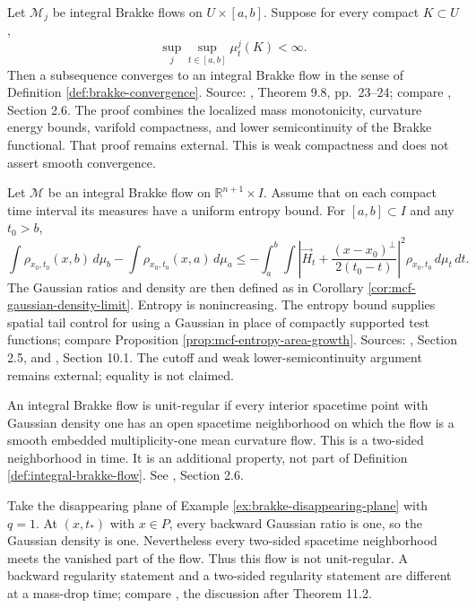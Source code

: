 \begin{theorem}\label{thm:brakke-compactness}
Let $\mathcal M_j$ be integral Brakke flows on $U\times[a,b]$. Suppose for every compact $K\subset U$,
\[
 \sup_j\sup_{t\in[a,b]}\mu_t^j(K)<\infty.
\]
Then a subsequence converges to an integral Brakke flow in the sense of Definition \ref{def:brakke-convergence}. Source: \cite{WhiMCF15}, Theorem 9.8, pp.~23--24; compare \cite{CCMS20}, Section 2.6. The proof combines the localized mass monotonicity, curvature energy bounds, varifold compactness, and lower semicontinuity of the Brakke functional. That proof remains external. This is weak compactness and does not assert smooth convergence.
\end{theorem}

\begin{theorem}\label{thm:brakke-gaussian-monotonicity}
Let $\mathcal M$ be an integral Brakke flow on $\mathbb R^{n+1}\times I$. Assume that on each compact time interval its measures have a uniform entropy bound. For $[a,b]\subset I$ and any $t_0>b$,
\[
 \int\rho_{x_0,t_0}(x,b)\,d\mu_b-
 \int\rho_{x_0,t_0}(x,a)\,d\mu_a
 \leq-\int_a^b\int\left|\vec H_t+
 \frac{(x-x_0)^\perp}{2(t_0-t)}\right|^2\rho_{x_0,t_0}\,d\mu_t\,dt.
\]
The Gaussian ratios and density are then defined as in Corollary \ref{cor:mcf-gaussian-density-limit}. Entropy is nonincreasing. The entropy bound supplies spatial tail control for using a Gaussian in place of compactly supported test functions; compare Proposition \ref{prop:mcf-entropy-area-growth}. Sources: \cite{CCMS20}, Section 2.5, and \cite{WhiMCF15}, Section 10.1. The cutoff and weak lower-semicontinuity argument remains external; equality is not claimed.
\end{theorem}

\begin{definition}\label{def:unit-regular-brakke}
An integral Brakke flow is unit-regular if every interior spacetime point with Gaussian density one has an open spacetime neighborhood on which the flow is a smooth embedded multiplicity-one mean curvature flow. This is a two-sided neighborhood in time. It is an additional property, not part of Definition \ref{def:integral-brakke-flow}. See \cite{CCMS20}, Section 2.6.
\end{definition}

\begin{example}\label{ex:brakke-density-one-drop}
Take the disappearing plane of Example \ref{ex:brakke-disappearing-plane} with $q=1$. At $(x,t_*)$ with $x\in P$, every backward Gaussian ratio is one, so the Gaussian density is one. Nevertheless every two-sided spacetime neighborhood meets the vanished part of the flow. Thus this flow is not unit-regular. A backward regularity statement and a two-sided regularity statement are different at a mass-drop time; compare \cite{WhiMCF15}, the discussion after Theorem 11.2.
\end{example}

